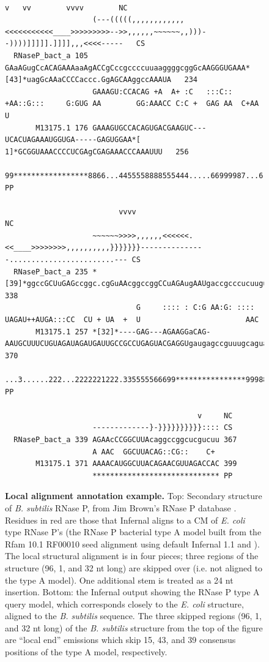 \begin{figure}[tp]
\begin{center}
{\begin{BVerbatim}
                                                                                           v   vv        vvvv        NC
                    (---(((((,,,,,,,,,,,,<<<<<<<<<<<____>>>>>>>>>-->>,,,,,,~~~~~~,,)))--))))]]]]].]]]],,,<<<<-----   CS
  RNaseP_bact_a 105 GAaAGugCcACAGAAAaaAgACCgCccgccccuuaaggggcggGcAAGGGUGAAA*[43]*uagGcAAaCCCCaccc.GgAGCAAggccAAAUA   234
                    GAAAGU:CCACAG +A  A+ :C   :::C:: +AA::G:::     G:GUG AA        GG:AAACC C:C +  GAG AA  C+AA U 
       M13175.1 176 GAAAGUGCCACAGUGACGAAGUC---UCACUAGAAAUGGUGA-----GAGUGGAA*[ 1]*GCGGUAAACCCCUCGAgCGAGAAACCCAAAUUU   256
                    99*****************8866...4455558888555444.....66999987...6..99********97665577899888765444332   PP

                          vvvv                                                                                       NC
                    ~~~~~~>>>>,,,,,,<<<<<<.<<____>>>>>>>>,,,,,,,,,,}}}}}}}---------------........................--- CS
  RNaseP_bact_a 235 *[39]*ggccGCUuGAGccggc.cgGuAAcggccggCCuAGAugAAUgaccgcccucuuguuaaauuuu........................aAC 338
                              G     :::: : C:G AA:G: :::: UAGAU++AUGA:::CC  CU + UA  +  U                        AAC
       M13175.1 257 *[32]*----GAG---AGAAGGaCAG-AAUGCUUUCUGUAGAUAGAUGAUUGCCGCCUGAGUACGAGGUgaugagccguuugcaguacgauggAAC 370
                    ...3......222...2222221222.335555566699****************9998888888888899999********************** PP

                                            v     NC
                    -------------}-}}}}}}}}}}:::: CS
  RNaseP_bact_a 339 AGAAcCCGGCUUAcaggccggcucgucuu 367
                    A AAC  GGCUUACAG::CG::    C+ 
       M13175.1 371 AAAACAUGGCUUACAGAACGUUAGACCAC 399
                    ***************************** PP
\end{BVerbatim}
}
\end{center}
\caption{\small \textbf{Local alignment annotation example.} Top:
Secondary structure of \emph{B. subtilis} RNase P, from Jim Brown's
RNase P database \citep{Brown99}. Residues in red are those that
Infernal aligns to a CM of \emph{E. coli} type RNase P's
(the RNase P bacterial type A model built from the Rfam 10.1 RF00010
seed alignment using default Infernal 1.1  and
). The local structural alignment is in four pieces;
three regions of the structure (96, 1, and 32 nt long) are skipped
over (i.e. not aligned to the type A model). One additional stem is
treated as a 24 nt insertion.  Bottom: the Infernal 
output showing the RNase P type A query model, which corresponds
closely to the \emph{E. coli} structure, aligned to the
\emph{B. subtilis} sequence. The three skipped regions (96, 1, and 32
nt long) of the \emph{B. subtilis} structure from the top of the
figure are ``local end'' emissions which skip 15, 43, and 39 consensus
positions of the type A model, respectively.}
\label{fig:bsu-alignment}
\end{figure}

